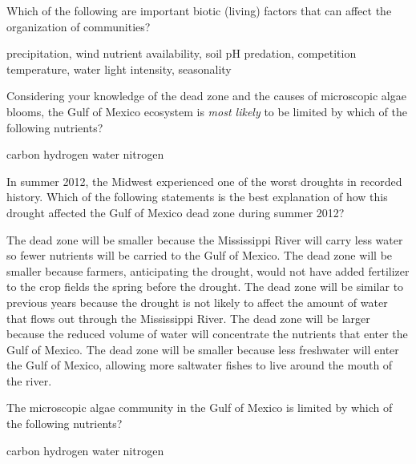 \question
Which of the following are important biotic (living) factors that can affect the  organization of communities?

\begin{choices}
\choice precipitation, wind%
\choice nutrient availability, soil pH%
\correctchoice predation, competition%
\choice temperature, water%
\choice light intensity, seasonality%
\end{choices}



\question
Considering your knowledge of the dead zone and the causes of microscopic algae blooms, the Gulf of Mexico ecosystem is \emph{most likely} to be limited by which of the following nutrients?

\begin{choices}
	\choice carbon%
	\choice {}%
	\choice hydrogen%
	\choice water%
	\correctchoice nitrogen%
\end{choices}

\question
In summer 2012, the Midwest experienced one of the worst droughts in recorded history. Which of the following statements is the best explanation of how this drought affected the Gulf of Mexico dead zone during summer 2012?

\begin{choices}
\correctchoice The dead zone will be smaller because the Mississippi River will carry less water so fewer nutrients will be carried to the Gulf of Mexico.%
\choice The dead zone will be smaller because farmers, anticipating the drought, would not have added fertilizer to the crop fields the spring before the drought.%
\choice The dead zone will be similar to previous years because the drought is not likely to affect the amount of water that flows out through the Mississippi River.%
\choice The dead zone will be larger because the reduced volume of water will concentrate the nutrients that enter the Gulf of Mexico.%
\choice The dead zone will be smaller because less freshwater will enter the Gulf of Mexico, allowing more saltwater fishes to live around the mouth of the river.%
\end{choices}


\question
The microscopic algae community in the Gulf of Mexico is limited by which of the following nutrients?

\begin{choices}
\choice carbon%
\choice {}%
\choice hydrogen%
\choice water%
\correctchoice nitrogen%
\end{choices}


